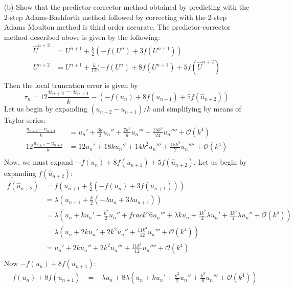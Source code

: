 \documentclass{article}
\begin{document}
\begin{enumerate}
    
    \item[(b)] Show that the predictor-corrector method obtained by predicting with the 2-step Adams-Bashforth method followed by correcting with the 2-step Adams Moulton method is third order accurate.
    \newline
    The predictor-corrector method described above is given by the following:
    \begin{align*}
        \hat{U}^{n+2} &= U^{n+1} + \frac{k}{2}(-f(U^n) + 3f(U^{n+1})) \\
        U^{n+2} &= U^{n+1} + \frac{k}{12}(-f(U^n) + 8f(U^{n+1}) + 5f(\hat{U}^{n+2}) \\
    \end{align*}
    Then the local truncation error is given by
    \[\tau_n = 12\frac{u_{n+2} - u_{n+1}}{k} - (-f(u_n) + 8f(u_{n+1}) + 5f(\hat{u}_{n+2}))\]
    Let us begin by expanding $(u_{n+2} - u_{n+1})/k$ and simplifying by means of Taylor series:
    \begin{align*}
        \frac{u_{n+2} - u_{n+1}}{k} &= u_n' + \frac{3k}{2}u_n'' + \frac{7k^2}{6}u_n''' + \frac{15k^3}{24}u_n'''' + \mathcal{O}(k^4) \\
        12\frac{u_{n+2} - u_{n+1}}{k} &= 12u_n' + 18ku_n'' + 14k^2u_n''' + \frac{15k^3}{2}u_n'''' + \mathcal{O}(k^4) \\ 
    \end{align*}
    Now, we must expand $-f(u_n) + 8f(u_{n+1}) + 5f(\hat{u}_{n+2})$. Let us begin by expanding $f(\hat{u}_{n+2})$:
    \begin{align*}
        f(\hat{u}_{n+2}) &= f\left(u_{n+1} + \frac{k}{2}(-f(u_n) + 3f(u_{n+1}))\right) \\
        &= \lambda \left(u_{n+1} + \frac{k}{2}(-\lambda u_n + 3\lambda u_{n+1})\right) \\
        &= \lambda \left(u_n + ku_n' + \frac{k^2}{2}u_n'' + frac{k^3}{6}u_n''' + \lambda ku_n + \frac{3k^2}{2}\lambda u_n' + \frac{3k^3}{4}\lambda u_n'' + \mathcal{O}(k^4) \right) \\
        &= \lambda \left( u_n + 2ku_n' + 2k^2u_n'' + \frac{11k^3}{12}u_n''' + \mathcal{O}(k^4) \right) \\
        &= u_n' + 2ku_n'' + 2k^2u_n''' + \frac{11k^3}{12}u_n'''' + \mathcal{O}(k^4) \\
    \end{align*}
    Now $-f(u_n) + 8f(u_{n+1})$:
    \begin{align*}
        -f(u_n) + 8f(u_{n+1}) &= -\lambda u_n + 8\lambda\left(u_n + ku_n' + \frac{k^2}{2}u_n'' + \frac{k^3}{6}u_n''' + \mathcal{O}(k^4)\right) \\

\end{align*}
\end{enumerate}
\end{document}

